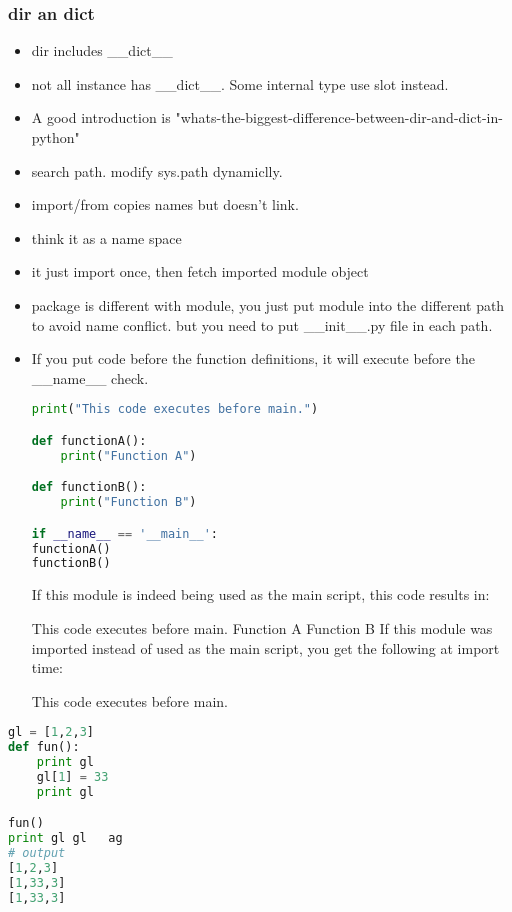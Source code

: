 \documentclass[a4paper,12pt,twoside]{book}
\begin{document}
\subsubsection{dir an dict}
\begin{itemize}
	\item dir includes \_\_dict\_\_
	\item not all instance has \_\_dict\_\_. Some internal type use slot instead. 
	\item A good introduction is "whats-the-biggest-difference-between-dir-and-dict-in-python"
\end{itemize}

\begin{itemize}
	\item search path. modify sys.path dynamiclly. 
	\item import/from copies names but doesn't link.
	\item think it as a name space
	\item it just import once, then fetch imported module object
	\item package is different with module, you just put module into the different path to avoid name conflict. but you need to put \_\_init\_\_.py file in each path. 
	\item If you put code before the function definitions, it will execute before the \_\_name\_\_ check.
\begin{lstlisting}[frame=single, language=python]
print("This code executes before main.") 

def functionA():
	print("Function A")

def functionB():
	print("Function B")

if __name__ == '__main__':
functionA()
functionB()
	\end{lstlisting} 
If this module is indeed being used as the main script, this code results in:

This code executes before main. 
Function A 
Function B
If this module was imported instead of used as the main script, you get the following at import time:

This code executes before main. 

\end{itemize}

\begin{lstlisting}[frame=single, language=python]
gl = [1,2,3]
def fun():
	print gl
	gl[1] = 33
	print gl

fun()
print gl gl   ag 
# output 
[1,2,3]
[1,33,3]
[1,33,3]
\end{lstlisting}  
\end{document}
